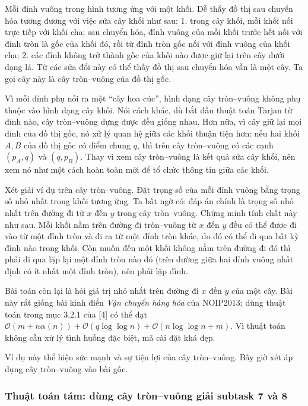 \documentclass[11pt]{article}
\newcommand{\Oh}{\mathcal{O}}
\begin{document}
Mỗi đỉnh vuông trong hình tương ứng với một khối. Dễ thấy đồ thị sau chuyển
hóa tương đương với việc sửa cây khối như sau: 1. trong cây khối, mỗi khối nối
trực tiếp với khối cha; sau chuyển hóa, đỉnh vuông của mỗi khối trước hết nối
với đỉnh tròn là gốc của khối đó, rồi từ đỉnh tròn gốc nối với đỉnh vuông của
khối cha; 2. các đỉnh không trở thành gốc của khối nào được giữ lại trên cây
dưới dạng lá. Từ các sửa đổi này có thể thấy đồ thị sau chuyển hóa vẫn là một
cây. Ta gọi cây này là cây tròn--vuông của đồ thị gốc.

Vì mỗi đỉnh phụ nối ra một ``cây hoa cúc'', hình dạng cây tròn--vuông không
phụ thuộc vào hình dạng cây khối. Nói cách khác, dù bắt đầu thuật toán Tarjan
từ đỉnh nào, cây tròn--vuông dựng được đều giống nhau. Hơn nữa, vì cây giữ lại
mọi đỉnh của đồ thị gốc, nó xử lý quan hệ giữa các khối thuận tiện hơn: nếu
hai khối \(A,B\) của đồ thị gốc có điểm chung \(q\), thì trên cây tròn--vuông
có các cạnh \((p_A,q)\) và \((q,p_B)\). Thay vì xem cây tròn--vuông là kết quả
sửa cây khối, nên xem nó như một cách hoàn toàn mới để tổ chức thông tin giữa
các khối.

Xét giải ví dụ trên cây tròn--vuông. Đặt trọng số của mỗi đỉnh vuông bằng
trọng số nhỏ nhất trong khối tương ứng. Ta bất ngờ có: đáp án chính là trọng
số nhỏ nhất trên đường đi từ \(x\) đến \(y\) trong cây tròn--vuông. Chứng minh
tính chất này như sau. Mỗi khối nằm trên đường đi tròn--vuông từ \(x\) đến
\(y\) đều có thể được đi vào từ một đỉnh tròn và đi ra từ một đỉnh tròn khác,
do đó có thể đi qua bất kỳ đỉnh nào trong khối. Còn muốn đến một khối không
nằm trên đường đi đó thì phải đi qua lặp lại một đỉnh tròn nào đó (trên đường
giữa hai đỉnh vuông nhất định có ít nhất một đỉnh tròn), nên phải lặp đỉnh.

Bài toán còn lại là hỏi giá trị nhỏ nhất trên đường đi \(x\) đến \(y\) của một
cây. Bài này rất giống bài kinh điển \emph{Vận chuyển hàng hóa} của NOIP2013;
dùng thuật toán trong mục 3.2.1 của [4] có thể đạt
\(\Oh(m+n\alpha(n))+\Oh(q\log\log n)+\Oh(n\log\log n+m)\). Vì thuật toán không
cần xử lý tình huống đặc biệt, mã cài đặt khá đẹp.

Ví dụ này thể hiện sức mạnh và sự tiện lợi của cây tròn--vuông. Bây giờ xét
áp dụng cây tròn--vuông vào bài gốc.

\subsubsection{Thuật toán tám: dùng cây tròn--vuông giải subtask 7 và 8}
\end{document}
